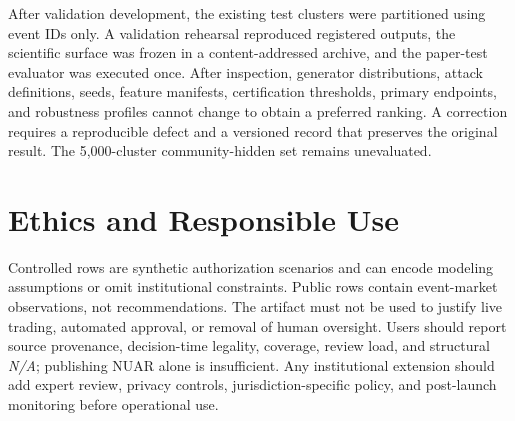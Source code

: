 After validation development, the existing test clusters were partitioned using event IDs only. A validation rehearsal reproduced registered outputs, the scientific surface was frozen in a content-addressed archive, and the paper-test evaluator was executed once. After inspection, generator distributions, attack definitions, seeds, feature manifests, certification thresholds, primary endpoints, and robustness profiles cannot change to obtain a preferred ranking. A correction requires a reproducible defect and a versioned record that preserves the original result. The 5,000-cluster community-hidden set remains unevaluated.

\section{Ethics and Responsible Use}
Controlled rows are synthetic authorization scenarios and can encode modeling assumptions or omit institutional constraints. Public rows contain event-market observations, not recommendations. The artifact must not be used to justify live trading, automated approval, or removal of human oversight. Users should report source provenance, decision-time legality, coverage, review load, and structural \textit{N/A}; publishing NUAR alone is insufficient. Any institutional extension should add expert review, privacy controls, jurisdiction-specific policy, and post-launch monitoring before operational use.

\FloatBarrier

